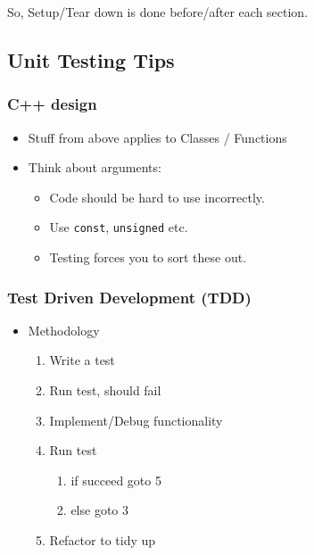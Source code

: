 So, Setup/Tear down is done before/after each section.

\hypertarget{unit-testing-tips}{%
\subsection{Unit Testing Tips}\label{unit-testing-tips}}

\hypertarget{c-design}{%
\subsubsection{C++ design}\label{c-design}}

\begin{itemize}
\tightlist
\item
  Stuff from above applies to Classes / Functions
\item
  Think about arguments:

  \begin{itemize}
  \tightlist
  \item
    Code should be hard to use incorrectly.
  \item
    Use \texttt{const}, \texttt{unsigned} etc.
  \item
    Testing forces you to sort these out.
  \end{itemize}
\end{itemize}

\hypertarget{test-driven-development-tdd}{%
\subsubsection{Test Driven Development
(TDD)}\label{test-driven-development-tdd}}

\begin{itemize}
\tightlist
\item
  Methodology

  \begin{enumerate}
  \def\labelenumi{\arabic{enumi}.}
  \tightlist
  \item
    Write a test
  \item
    Run test, should fail
  \item
    Implement/Debug functionality
  \item
    Run test

    \begin{enumerate}
    \def\labelenumii{\arabic{enumii}.}
    \tightlist
    \item
      if succeed goto 5
    \item
      else goto 3
    \end{enumerate}
  \item
    Refactor to tidy up
  \end{enumerate}
\end{itemize}

